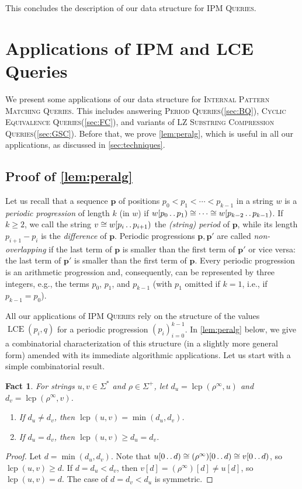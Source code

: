 \documentclass[a4paper]{article}
\newtheorem{fact}[theorem]{Fact}
\theoremstyle{definition}
\theoremstyle{remark}
\newcommand{\IPMFull}{\textsc{Internal Pattern Matching Queries}\xspace}
\newcommand{\IPM}{\textsc{IPM Queries}\xspace}
\newcommand{\PQ}{\textsc{Period Queries}\xspace}
\newcommand{\FC}{\textsc{Cyclic Equivalence Queries}\xspace}
\newcommand{\LSC}{\textsc{LZ Substring Compression Queries}\xspace}
\newcommand{\LCE}{\operatorname{LCE}\xspace}
\newcommand{\lcp}{\operatorname{lcp}}
\newcommand{\lcpinf}[2]{\lcp({#1}^\infty, {#2})}
\newcommand{\dd}{\mathinner{\ldotp\ldotp}}
\begin{document}
\medskip
\noindent
This concludes the description of our data structure for \IPM.

\thmipm*

\section{Applications of IPM and LCE Queries}\label{chp:app}
We present some applications of our data structure for \IPMFull.
This includes answering \PQ (\cref{sec:BQ}), \FC (\cref{sec:FC}), and variants of \LSC (\cref{sec:GSC}).
Before that, we prove \cref{lem:peralg}, which is useful in all our applications, as discussed in \cref{sec:techniques}.

\subsection{Proof of \cref{lem:peralg}}\label{sec:app:comb}

Let us recall that a sequence $\mathbf{p}$ of positions $p_0< p_1 < \cdots < p_{k-1}$ in a string $w$
is a  \emph{periodic progression} of length $k$ (in $w$) if $w[p_0 \dd  p_{1})\cong \cdots \cong w[p_{k-2}\dd  p_{k-1})$.
If $k\ge 2$, we call the string  $v\cong w[p_i \dd  p_{i+1})$ the \emph{(string) period} of $\mathbf{p}$, while its length $p_{i+1}-p_i$ is the \emph{difference} of $\mathbf{p}$.
Periodic progressions $\mathbf{p},\mathbf{p}'$ are called \emph{non-overlapping} if the last term of $\mathbf{p}$ is smaller than the first term of $\mathbf{p}'$ or vice versa: the last term of $\mathbf{p}'$ is smaller than the first term of $\mathbf{p}$.
Every periodic progression is an arithmetic progression and, consequently, can be represented by three integers,
e.g., the terms $p_0$, $p_1$, and $p_{k-1}$ (with $p_1$ omitted if $k=1$, i.e., if $p_{k-1}=p_0$).

All our applications of \IPM rely on the structure of the values $\LCE(p_i,q)$ for a periodic progression $(p_i)_{i=0}^{k-1}$.
In \cref{lem:peralg} below, we give a combinatorial characterization of this structure (in a slightly more general form) amended with its immediate algorithmic applications.
Let us start with a simple combinatorial result.
\begin{fact}\label{fct:lcp}
For strings $u,v\in \Sigma^*$ and $\rho\in\Sigma^+$, let $d_u = \lcpinf{\rho}{u}$ and $d_v=\lcpinf{\rho}{v}$.
\begin{enumerate}[label=(\alph*)]
  \item If $d_u \ne d_v$, then $\lcp(u,v)=\min(d_u,d_v)$.
  \item If $d_u = d_v$, then $\lcp(u,v)\ge d_u=d_v$.
\end{enumerate}
\end{fact}
\begin{proof}
Let $d=\min(d_u,d_v)$. Note that $u[0\dd d)\cong (\rho^\infty)[0\dd d)\cong v[0\dd d)$, so $\lcp(u,v)\ge d$.
If $d=d_u < d_v$, then $v[d]=(\rho^\infty)[d]\ne u[d]$, so $\lcp(u,v)=d$. The case of $d=d_v < d_u$ is symmetric.
\end{proof}
\end{document}
